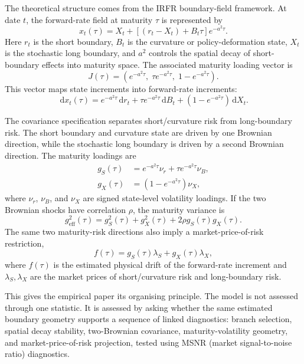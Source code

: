 \documentclass[11pt]{article}
\newcommand{\dd}{\,\mathrm{d}}
\begin{document}
The theoretical structure comes from the IRFR boundary-field framework. At date $t$, the forward-rate field at maturity $\tau$ is represented by
\begin{equation}
  x_t(\tau)
  = X_t + \left[(r_t-X_t)+B_t\tau\right]e^{-a^2\tau}.
  \label{eq:boundary-field}
\end{equation}
Here $r_t$ is the short boundary, $B_t$ is the curvature or policy-deformation state, $X_t$ is the stochastic long boundary, and $a^2$ controls the spatial decay of short-boundary effects into maturity space. The associated maturity loading vector is
\begin{equation}
  J(\tau)=
  \left(
    e^{-a^2\tau},\;
    \tau e^{-a^2\tau},\;
    1-e^{-a^2\tau}
  \right).
  \label{eq:J-loading}
\end{equation}
This vector maps state increments into forward-rate increments:
\begin{equation}
  \dd x_t(\tau)
  = e^{-a^2\tau}\dd r_t
  + \tau e^{-a^2\tau}\dd B_t
  + (1-e^{-a^2\tau})\dd X_t.
  \label{eq:increment-map}
\end{equation}

The covariance specification separates short/curvature risk from long-boundary risk. The short boundary and curvature state are driven by one Brownian direction, while the stochastic long boundary is driven by a second Brownian direction. The maturity loadings are
\begin{align}
  g_S(\tau)
  &= e^{-a^2\tau}\nu_r + \tau e^{-a^2\tau}\nu_B, \label{eq:gS}\\
  g_X(\tau)
  &= (1-e^{-a^2\tau})\nu_X, \label{eq:gX}
\end{align}
where $\nu_r$, $\nu_B$, and $\nu_X$ are signed state-level volatility loadings. If the two Brownian shocks have correlation $\rho$, the maturity variance is
\begin{equation}
  g_{\mathrm{eff}}^2(\tau)
  = g_S^2(\tau)+g_X^2(\tau)+2\rho g_S(\tau)g_X(\tau).
  \label{eq:geff}
\end{equation}
The same two maturity-risk directions also imply a market-price-of-risk restriction,
\begin{equation}
  f(\tau)=g_S(\tau)\lambda_S+g_X(\tau)\lambda_X,
  \label{eq:risk-price}
\end{equation}
where $f(\tau)$ is the estimated physical drift of the forward-rate increment and $\lambda_S,\lambda_X$ are the market prices of short/curvature risk and long-boundary risk.

This gives the empirical paper its organising principle. The model is not assessed through one statistic. It is assessed by asking whether the same estimated boundary geometry supports a sequence of linked diagnostics: branch selection, spatial decay stability, two-Brownian covariance, maturity-volatility geometry, and market-price-of-risk projection, tested using MSNR (market signal-to-noise ratio) diagnostics.
\end{document}
